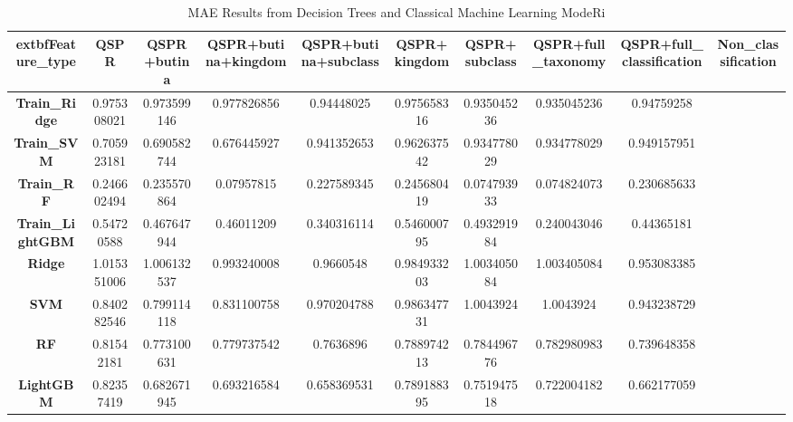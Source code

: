 ﻿\begin{table}[!ht]
    \centering
    \caption{MAE Results from Decision Trees and Classical Machine Learning ModeRi}
    \begin{tabular}{|c|c|c|c|c|c|c|c|c|c|}
    \hline
        	extbf{Feature\_type} & \textbf{QSPR} & \textbf{QSPR+butina} & \textbf{QSPR+butina+kingdom} & \textbf{QSPR+butina+subclass} & \textbf{QSPR+kingdom} & \textbf{QSPR+subclass} & \textbf{QSPR+full\_taxonomy} & \textbf{QSPR+full\_classification} & \textbf{Non\_classification} \\ \hline
        \textbf{Train\_Ridge} & 0.975308021 & 0.973599146 & 0.977826856 & 0.94448025 & 0.975658316 & 0.935045236 & 0.935045236 & 0.94759258 & ~ \\ \hline
        \textbf{Train\_SVM} & 0.705923181 & 0.690582744 & 0.676445927 & 0.941352653 & 0.962637542 & 0.934778029 & 0.934778029 & 0.949157951 & ~ \\ \hline
        \textbf{Train\_RF} & 0.246602494 & 0.235570864 & 0.07957815 & 0.227589345 & 0.245680419 & 0.074793933 & 0.074824073 & 0.230685633 & ~ \\ \hline
        \textbf{Train\_LightGBM} & 0.54720588 & 0.467647944 & 0.46011209 & 0.340316114 & 0.546000795 & 0.493291984 & 0.240043046 & 0.44365181 & ~ \\ \hline
        \textbf{Ridge} & 1.015351006 & 1.006132537 & 0.993240008 & 0.9660548 & 0.984933203 & 1.003405084 & 1.003405084 & 0.953083385 & ~ \\ \hline
        \textbf{SVM} & 0.840282546 & 0.799114118 & 0.831100758 & 0.970204788 & 0.986347731 & 1.0043924 & 1.0043924 & 0.943238729 & ~ \\ \hline
        \textbf{RF} & 0.81542181 & 0.773100631 & 0.779737542 & 0.7636896 & 0.788974213 & 0.784496776 & 0.782980983 & 0.739648358 & ~ \\ \hline
        \textbf{LightGBM} & 0.82357419 & 0.682671945 & 0.693216584 & 0.658369531 & 0.789188395 & 0.751947518 & 0.722004182 & 0.662177059 & ~ \\ \hline
    \end{tabular}
\end{table}